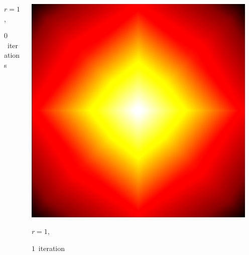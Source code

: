 \documentclass[aspectratio=169,t]{beamer}
\begin{document}
{\begin{columns}
\begin{column}{0.22\textwidth}
			{\footnotesize 
				\par \vspace{-1mm} $r=1$, 
				\par \vspace{-1mm} $0$~iterations
			}
		\end{column}
		\begin{column}{0.22\textwidth}
			\centering
			\includegraphics[width=.85\textwidth]{data/synthetic_meshes/square_tesselation_4tri_Dirac_delta_1_v13_f16_funcvals_1iter.png}
			{\footnotesize 
				\par \vspace{-1mm} $r=1$, 
				\par \vspace{-1mm} $1$~iteration
			}
		\end{column}
		\begin{column}{0.17\textwidth}~\end{column}
	\end{columns}
	\vspace*{4mm}
	\begin{columns}
		\begin{column}{0.17\textwidth}~\end{column}
		\begin{column}{0.22\textwidth}
			\centering

\end{column}
\end{columns}}
\end{document}
